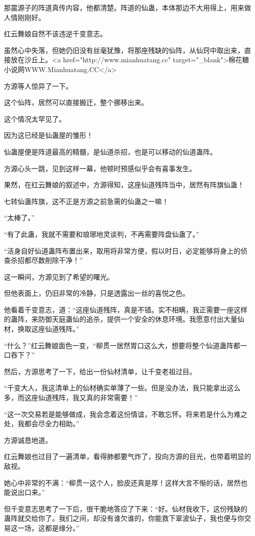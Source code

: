 \begin{this_body}
那震源子的阵道真传内容，他都清楚。阵道的仙蛊，本体那边不大用得上，用来做人情刚刚好。

红云舞娘自然不该违逆千变意志。

虽然心中失落，但她仍旧没有丝毫犹豫，将那座残缺的仙阵，从仙窍中取出来，直接放在沙丘上。<a href="http://www.mianhuatang.cc" target="\_blank">棉花糖小说网WWW.Mianhuatang.CC</a>

方源等人惊异了一下。

这个仙阵，居然可以直接搬迁，整个挪移出来。

这个情况太罕见了。

因为这已经是仙蛊屋的雏形！

仙蛊屋便是阵道最高的精髓，是仙道杀招，也是可以移动的仙道蛊阵。

方源心头一跳，见到这样一幕，他顿时预感似乎会有喜事发生。

果然，在红云舞娘的叙述中，方源得知，这座仙道残阵当中，居然有阵旗仙蛊！

七转仙蛊阵旗，这不正是方源之前急需的仙蛊之一嘛！

“太棒了。”

“有了此蛊，我就不需要和琅琊地灵谈判，不再需要阵盘仙蛊了。”

“洁身自好仙道蛊阵布置出来，取用将非常方便，假以时日，必定能够将身上的侦查杀招都尽数削除干净！”

这一瞬间，方源见到了希望的曙光。

但他表面上，仍旧非常的冷静，只是透露出一丝的喜悦之色。

他看着千变意志，道：“这座仙道残阵，真是不错。实不相瞒，我正需要一座这样的蛊阵，来防御天庭蛊仙的追杀，提供一个安全的休息环境。我愿意付出大量仙材，换取这座仙道残阵。”

“什么？”红云舞娘面色一变，“柳贯一居然胃口这么大，想要将整个仙道蛊阵都一口吞下？”

然后，方源思考了一下，给出一份仙材清单，让千变老祖过目。

“千变大人，我这清单上的仙材确实单薄了一些。但是没办法，我只能拿出这么多，而这座仙道残阵，我又真的非常需要！”

“这一次交易若是能够做成，我会念着这份情谊，不敢忘怀。将来若是什么为难之处，我都会尽全力相助。”

方源诚恳地道。

红云舞娘也过目了一遍清单，看得肺都要气炸了，投向方源的目光，也带着明显的敌视。

她心中非常的不满：“柳贯一这个人，脸皮还真是厚！这样大言不惭的话，居然也能说出口来。”

但千变意志思考了一下后，很干脆地答应了下来：“好。仙材我收下，这份残缺的蛊阵就交给你了。我们之间，却没有谁欠谁的，你能救下翠波仙子，我也便与你交易这一场，这都是缘分。”


\end{this_body}
